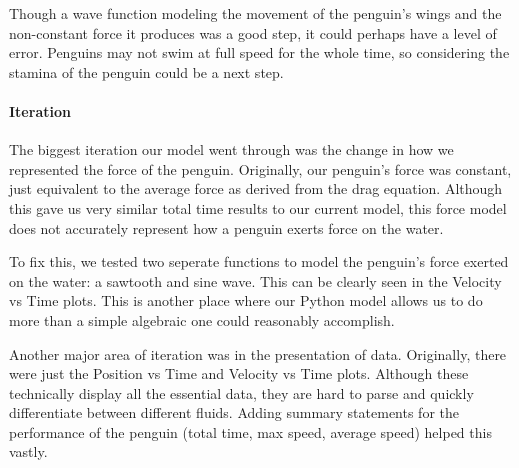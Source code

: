 \documentclass[11pt]{article}
\begin{document}
Though a wave function modeling the movement of the penguin's wings and
the non-constant force it produces was a good step, it could perhaps
have a level of error. Penguins may not swim at full speed for the whole
time, so considering the stamina of the penguin could be a next step.

\hypertarget{iteration}{%
\paragraph{Iteration}\label{iteration}}

The biggest iteration our model went through was the change in how we
represented the force of the penguin. Originally, our penguin's force
was constant, just equivalent to the average force as derived from the
drag equation. Although this gave us very similar total time results to
our current model, this force model does not accurately represent how a
penguin exerts force on the water.

To fix this, we tested two seperate functions to model the penguin's
force exerted on the water: a sawtooth and sine wave. This can be
clearly seen in the Velocity vs Time plots. This is another place where
our Python model allows us to do more than a simple algebraic one could
reasonably accomplish.

Another major area of iteration was in the presentation of data.
Originally, there were just the Position vs Time and Velocity vs Time
plots. Although these technically display all the essential data, they
are hard to parse and quickly differentiate between different fluids.
Adding summary statements for the performance of the penguin (total
time, max speed, average speed) helped this vastly.


    
    
    
    
\end{document}
